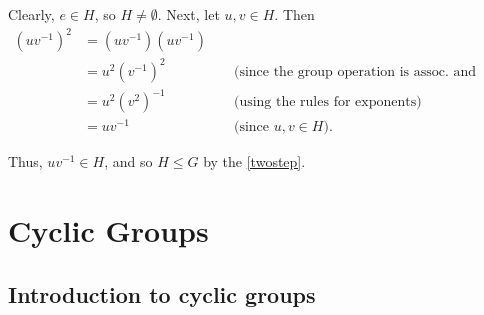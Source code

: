 \documentclass[10pt,]{book}
\theoremstyle{plain}
\theoremstyle{definition}
\theoremstyle{definition}
\theoremstyle{definition}
\theoremstyle{definition}
\numberwithin{equation}{section}
\newcommand{\amp}{ & }
\begin{document}
\begin{exerciselist}
      Clearly, \(e\in H\), so \(H\neq \emptyset\). Next, let \(u,v\in H\). Then
\begin{align*}
(uv^{-1})^2\amp =(uv^{-1})(uv^{-1})\amp \amp\\
\amp =u^2(v^{-1})^2 \amp \amp \text{ (since the group operation is assoc. and comm.) }\\
\amp =u^2(v^2)^{-1} \amp \amp \text{ (using the rules for exponents) }\\
\amp =uv^{-1}\amp \amp \text{ (since \(u,v\in H\)). }
\end{align*}

\par

      Thus, \(uv^{-1}\in H\), and so \(H \leq G\) by the \hyperref[twostep]{\ref{twostep}}.
\end{exerciselist}
\typeout{************************************************}
\typeout{************************************************}
\chapter[{Cyclic Groups}]{Cyclic Groups}\label{cyc}
\typeout{************************************************}
\typeout{************************************************}
\section[{Introduction to cyclic groups}]{Introduction to cyclic groups}\label{section-15}
\end{document}

